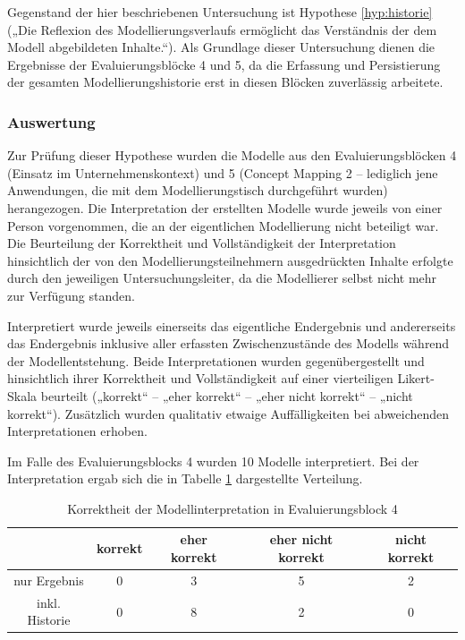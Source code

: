 Gegenstand der hier beschriebenen Untersuchung ist Hypothese \ref{hyp:historie} („Die Reflexion des Modellierungsverlaufs ermöglicht das Verständnis der dem Modell abgebildeten Inhalte.“). Als Grundlage dieser Untersuchung dienen die Ergebnisse der Evaluierungsblöcke 4 und 5, da die Erfassung und Persistierung der gesamten Modellierungshistorie erst in diesen Blöcken zuverlässig arbeitete.

\subsubsection{Auswertung} 
 
Zur Prüfung dieser Hypothese wurden die Modelle aus den Evaluierungsblöcken 4 (Einsatz im Unternehmenskontext) und 5 (Concept Mapping 2 -- lediglich jene Anwendungen, die mit dem Modellierungstisch durchgeführt wurden) herangezogen. Die Interpretation der erstellten Modelle wurde jeweils von einer Person vorgenommen, die an der eigentlichen Modellierung nicht beteiligt war. Die Beurteilung der Korrektheit und Vollständigkeit der Interpretation hinsichtlich der von den Modellierungsteilnehmern ausgedrückten Inhalte erfolgte durch den jeweiligen Untersuchungsleiter, da die Modellierer selbst nicht mehr zur Verfügung standen.

Interpretiert wurde jeweils einerseits das eigentliche Endergebnis und andererseits das Endergebnis inklusive aller erfassten Zwischenzustände des Modells während der Modellentstehung. Beide Interpretationen wurden gegenübergestellt und hinsichtlich ihrer Korrektheit und Vollständigkeit auf einer vierteiligen Likert-Skala beurteilt („korrekt“ -- „eher korrekt“ -- „eher nicht korrekt“ -- „nicht korrekt“). Zusätzlich wurden qualitativ etwaige Auffälligkeiten bei abweichenden Interpretationen erhoben.

Im Falle des Evaluierungsblocks 4 wurden 10 Modelle interpretiert. Bei der Interpretation ergab sich die in Tabelle \ref{tab:interpretation_block4} dargestellte Verteilung.

\begin{table}[htbp]
	\centering
	\caption{Korrektheit der Modellinterpretation in Evaluierungsblock 4}
\begin{tabular}{| c || c | c | c | c |}
  \hline
   & korrekt & eher korrekt & eher nicht korrekt & nicht korrekt \\ \hline
   nur Ergebnis   & 0 & 3 & 5 & 2 \\ 
   inkl. Historie & 0 & 8 & 2 & 0 \\ \hline
\end{tabular} \\
	\label{tab:interpretation_block4}
\end{table}

